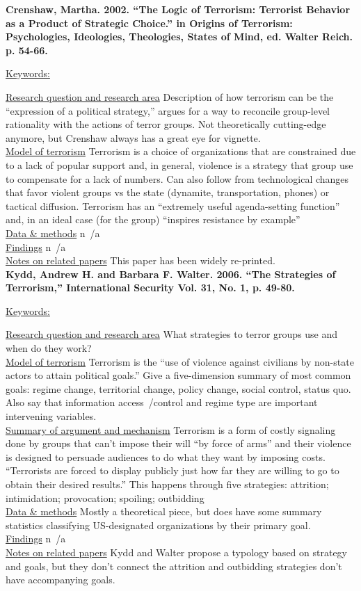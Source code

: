 \documentclass{article}[12pt]
\begin{document}
\textbf{Crenshaw, Martha. 2002. “The Logic of Terrorism: Terrorist Behavior as a Product of Strategic Choice.” in Origins of Terrorism: Psychologies, Ideologies, Theologies, States of Mind, ed. Walter
Reich. p. 54-66.}

\underline{Keywords:}

\underline{Research question and research area} Description of how terrorism can be the ``expression of a political strategy,'' argues for a way to reconcile group-level rationality with the actions of terror groups. Not theoretically cutting-edge anymore, but Crenshaw always has a great eye for vignette. \\
\underline{Model of terrorism} Terrorism is a choice of organizations that are constrained due to a lack of popular support and, in general, violence is a strategy that group use to compensate for a lack of numbers. Can also follow from technological changes that favor violent groups vs the state (dynamite, transportation, phones) or tactical diffusion. Terrorism has an  ``extremely useful agenda-setting function'' and, in an ideal case (for the group) ``inspires resistance by example'' \\
\underline{Data \& methods} n~/a\\
\underline{Findings} n~/a\\
\underline{Notes on related papers} This paper has been widely re-printed.\\

\textbf{Kydd, Andrew H. and Barbara F. Walter. 2006. “The Strategies of Terrorism,” International
Security Vol. 31, No. 1, p. 49-80.}

\underline{Keywords:}

\underline{Research question and research area} What strategies to terror groups use and when do they work?\\
\underline{Model of terrorism} Terrorism is the ``use of violence against civilians by non-state actors to attain political goals.'' Give a five-dimension summary of most common goals: regime change, territorial change, policy change, social control, status quo. Also say that information access~/control and regime type are important intervening variables. \\
\underline{Summary of argument and mechanism} Terrorism is a form of costly signaling done by groups that can't impose their will ``by force of arms'' and their violence is designed to persuade audiences to do what they want by imposing costs. ``Terrorists are forced to display publicly just how far they are willing to go to obtain their desired results.''  This happens through five strategies: attrition; intimidation; provocation; spoiling; outbidding\\
\underline{Data \& methods} Mostly a theoretical piece, but does have some summary statistics classifying US-designated organizations by their primary goal. \\
\underline{Findings} n~/a\\
\underline{Notes on related papers} Kydd and Walter propose a typology based on strategy and goals, but they don't connect the attrition and outbidding strategies don't have accompanying goals.\\
\end{document}
